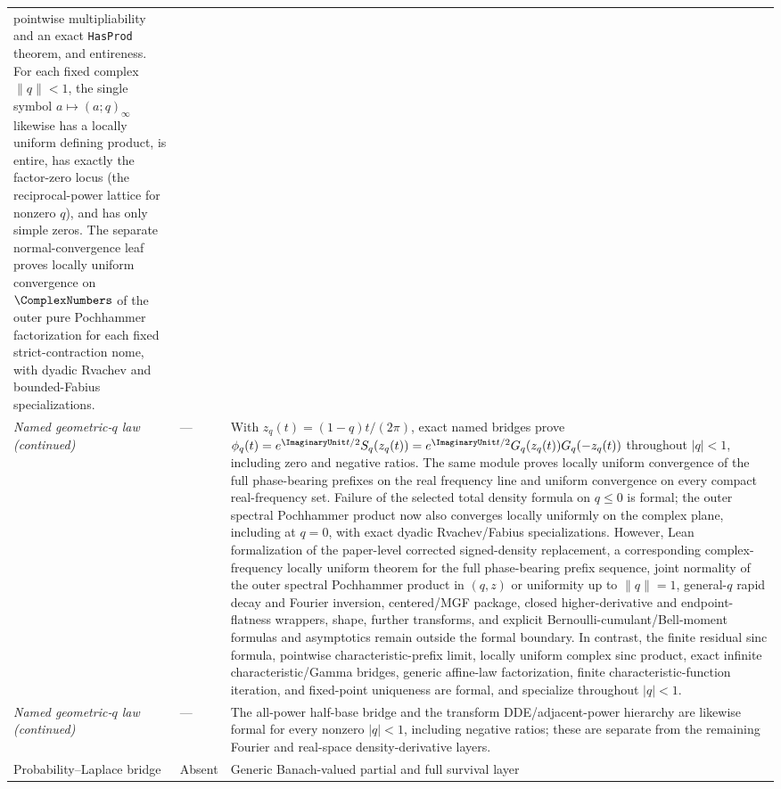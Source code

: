 \documentclass[11pt,oneside]{article}
\theoremstyle{definition}
\theoremstyle{remark}
\begin{document}
\begin{longtable}{@{}p{}p{}p{}@{}}
pointwise multipliability and an exact \texttt{HasProd} theorem, and entireness.  For each
fixed complex \(\lVert q\rVert<1\), the single symbol \(a\mapsto(a;q)_\infty\)
likewise has a locally uniform defining product, is entire, has exactly the
factor-zero locus (the reciprocal-power lattice for nonzero \(q\)), and has
only simple zeros.  The separate normal-convergence leaf proves locally
uniform convergence on \(\ComplexNumbers\) of the outer pure Pochhammer
factorization for each fixed strict-contraction nome, with dyadic Rvachev and
bounded-Fabius specializations.\\
\emph{Named geometric-\(q\) law (continued)} & --- &
With \(z_q(t)=(1-q)t/(2\pi)\), exact named bridges prove
\(\phi_q(t)=e^{\ImaginaryUnit t/2}S_q(z_q(t))
=e^{\ImaginaryUnit t/2}G_q(z_q(t))G_q(-z_q(t))\) throughout \(|q|<1\), including
zero and negative ratios.  The same module proves locally uniform convergence of the full
phase-bearing prefixes on the real frequency line and uniform convergence on every compact
real-frequency set.  Failure of the selected total density formula on \(q\le0\) is formal;
the outer spectral Pochhammer product now also converges locally uniformly on
the complex plane, including at \(q=0\), with exact dyadic Rvachev/Fabius
specializations.  However,
Lean formalization of the paper-level corrected signed-density replacement, a corresponding
complex-frequency locally uniform theorem for the full phase-bearing prefix sequence,
joint normality of the outer spectral Pochhammer product in \((q,z)\) or
uniformity up to \(\lVert q\rVert=1\),
general-\(q\) rapid decay and Fourier inversion, centered/MGF package, closed
higher-derivative and endpoint-flatness wrappers, shape, further transforms, and explicit
Bernoulli-cumulant/Bell-moment formulas and asymptotics remain outside the formal boundary.
In contrast, the finite residual sinc formula, pointwise characteristic-prefix limit,
locally uniform complex sinc product, exact infinite characteristic/Gamma bridges, generic
affine-law factorization, finite characteristic-function iteration, and fixed-point
uniqueness are formal, and specialize throughout \(|q|<1\).\\
\emph{Named geometric-\(q\) law (continued)} & --- &
The all-power half-base bridge and the transform DDE/adjacent-power hierarchy are likewise
formal for every nonzero \(|q|<1\), including negative ratios; these are separate from the
remaining Fourier and real-space density-derivative layers.\\
Probability--Laplace bridge & Absent & Generic Banach-valued partial and full survival layer

\end{longtable}
\end{document}
